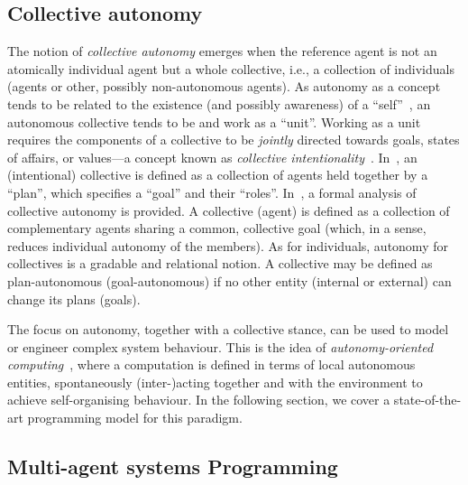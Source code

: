 \subsection{Collective autonomy}\label{s:collective-autonomy}

The notion of \emph{collective autonomy}
 emerges when the reference agent 
 is not an atomically individual agent
 but a whole collective, i.e., a collection of individuals (agents or other, possibly non-autonomous agents).
%
As autonomy as a concept tends to be related to the existence (and possibly awareness) of a ``self''~\cite{sekiyama1996dissipative-structure-network-for-collective-autonomy}, 
 an autonomous collective tends to be and work as a ``unit''.
%
Working as a unit requires the components of a collective
 to be \emph{jointly} directed towards goals, states of affairs, or values---a concept known as \emph{collective intentionality}~\cite{DBLP:journals/cogsr/BottazziCGL06,ray2009collective-intentionality-fleets}. 
%
In~\cite{DBLP:journals/cogsr/BottazziCGL06},
 an (intentional) collective
 is defined as a collection of agents held together by a ``plan'', which specifies a ``goal'' and their ``roles''.
%
In~\cite{conte2006collective-autonomy}, a formal analysis of collective autonomy is provided. A collective (agent) is defined as a collection of complementary agents sharing a common, collective goal (which, in a sense, reduces individual autonomy of the members).
%
As for individuals, autonomy for collectives is a gradable and relational notion.
%
A collective may be defined as plan-autonomous (goal-autonomous) if no other entity (internal or external) can change its plans (goals).
%

The focus on autonomy, together with a collective stance,
 can be used to model or engineer complex system behaviour.
%
This is the idea of \emph{autonomy-oriented computing}~\cite{liu2005autonomy-oriented-computing},
 where a computation is defined in terms
 of local autonomous entities, spontaneously (inter-)acting together and with the environment to achieve self-organising behaviour.
%
In the following section, we cover a state-of-the-art programming model for this paradigm.

\subsection{Multi-agent systems Programming}

